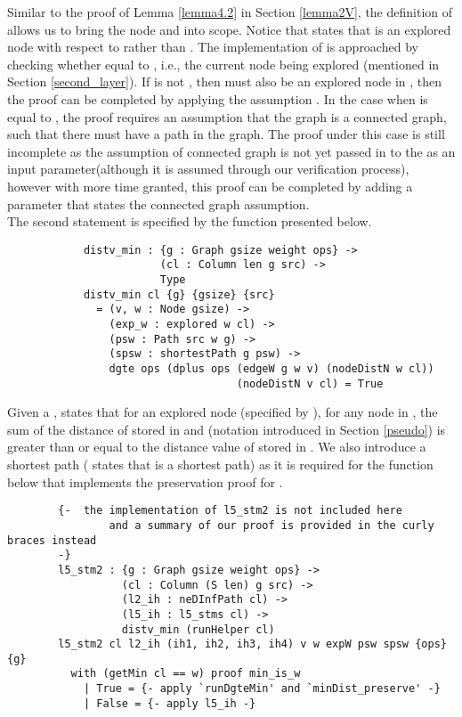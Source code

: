 Similar to the proof of Lemma \ref{lemma4.2} in Section \ref{lemma2V}, the definition of  allows us to bring the node  and  into scope. Notice that  states that  is an explored node with respect to  rather than . The implementation of  is approached by checking whether  equal to , i.e., the current node being explored (mentioned in Section \ref{second_layer}). If  is not , then  must also be an explored node in , then the proof can be completed by applying the assumption . In the case when  is equal to , the proof requires an assumption that the graph is a connected graph, such that there must have a  path in the graph. The proof under this case is still incomplete as the assumption of connected graph is not yet passed in to the  as an input parameter(although it is assumed through our verification process), however with more time granted, this proof can be completed by adding a parameter that states the connected graph assumption. 
\\

The second statement is specified by the  function presented below. 
\begin{lstlisting}
			distv_min : {g : Graph gsize weight ops} ->
			            (cl : Column len g src) ->
			            Type
			distv_min cl {g} {gsize} {src}
			  = (v, w : Node gsize) ->
			    (exp_w : explored w cl) ->
			    (psw : Path src w g) ->
			    (spsw : shortestPath g psw) ->
			    dgte ops (dplus ops (edgeW g w v) (nodeDistN w cl))
			    		 			(nodeDistN v cl) = True

\end{lstlisting} 

Given a  ,  states that for an explored node  (specified by ), for any node  in , the sum of the distance of  stored in  and  (notation introduced in Section \ref{pseudo}) is greater than or equal to the distance value of  stored in . We also introduce a shortest  path  ( states that  is a shortest path) as it is required for the  function below that implements the preservation proof for . 
\begin{lstlisting}
		{-  the implementation of l5_stm2 is not included here 
				and a summary of our proof is provided in the curly braces instead
		-}
		l5_stm2 : {g : Graph gsize weight ops} ->
		          (cl : Column (S len) g src) ->
		          (l2_ih : neDInfPath cl) ->
		          (l5_ih : l5_stms cl) ->
		          distv_min (runHelper cl)
		l5_stm2 cl l2_ih (ih1, ih2, ih3, ih4) v w expW psw spsw {ops} {g}
		  with (getMin cl == w) proof min_is_w
		    | True = {- apply `runDgteMin' and `minDist_preserve' -}
		    | False = {- apply l5_ih -}
\end{lstlisting}

